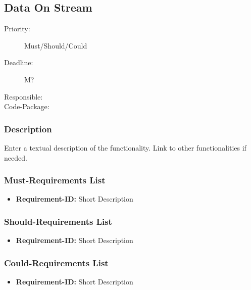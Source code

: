 \subsection{Data On Stream}
\label{Functionality:ID}

\begin{description}
\item[Priority:] Must/Should/Could
\item[Deadline:] M?
\item[Responsible:]
\item[Code-Package:]
\end{description}

\subsubsection*{Description}

Enter a textual description of the functionality. Link to other functionalities if needed. 


\subsubsection*{Must-Requirements List}

\begin{itemize}
\item \textbf{Requirement-ID:} Short Description
\end{itemize}

\subsubsection*{Should-Requirements List}

\begin{itemize}
\item \textbf{Requirement-ID:} Short Description
\end{itemize}

\subsubsection*{Could-Requirements List}

\begin{itemize}
\item \textbf{Requirement-ID:} Short Description
\end{itemize}

